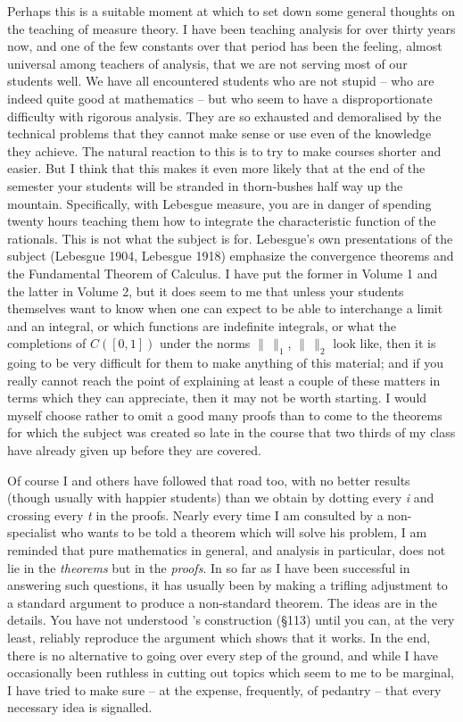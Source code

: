 Perhaps this is a suitable moment at which to set down some general
thoughts on the teaching of measure theory.   I have been teaching
analysis for over thirty years now, and one of the few constants over
that period has been the feeling, almost universal among teachers of
analysis, that we are not serving most of our students well.   We have
all encountered students who are not stupid -- who are indeed quite good
at mathematics -- but who seem to have a disproportionate difficulty
with rigorous analysis.   They are so exhausted and demoralised by the
technical problems that they cannot make sense or use even of the
knowledge they achieve.   The natural reaction to this is to try
to make courses shorter and easier.   But I think that this makes it
even more likely that at the end of the semester your students will be
stranded in thorn-bushes half way up the mountain.   Specifically, with
Lebesgue measure, you are in danger of spending twenty hours teaching
them how to integrate the characteristic function of the rationals.
This is not what the subject is for.   Lebesgue's own presentations of
the subject ({\smc Lebesgue 1904}, {\smc Lebesgue 1918}) emphasize the
convergence theorems and the Fundamental Theorem of Calculus.   I
have put the former in Volume 1 and the latter in Volume 2, but it does
seem to me that unless your students themselves want to know when one
can expect to be able to interchange a limit and an integral, or which
functions are indefinite integrals, or what the completions of
$C([0,1])$ under the norms $\|\,\|_1$,  $\|\,\|_2$  look like, then it
is going to be very difficult for them to make anything of this
material;  and if you really cannot reach the point of explaining at
least a couple
of these matters in terms which they can appreciate, then it may not be
worth starting.  I would myself choose rather to omit a good many proofs
than to come to the theorems for which the subject was created so late
in the course that two thirds of my class have already given up before
they are covered.

Of course I and others have followed that road too, with no better
results (though usually with happier students) than we obtain by dotting
every {\it i} and crossing every {\it t} in the proofs.   Nearly every
time I am
consulted by a non-specialist who wants to be told a theorem which will
solve his problem, I am reminded that pure mathematics in general, and
analysis in particular, does not lie in the {\it theorems} but in the
{\it proofs}.   In so far as I have been successful in answering such
questions, it has usually been by making a trifling adjustment to a
standard argument to produce a non-standard theorem.
The ideas are in the details.   You have not understood \Caratheodory's
construction (\S113) until you can, at the very least, reliably
reproduce the argument which shows that it works.   In the end, there is
no alternative to going over every step of the ground, and while I
have occasionally been ruthless in cutting out topics which seem to me
to be marginal, I have
tried to make sure -- at the expense, frequently, of pedantry -- that
every necessary idea is signalled.

